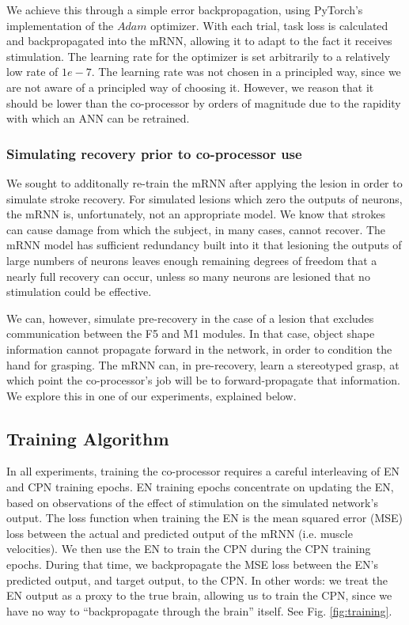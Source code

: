 \documentclass[12pt]{iopart}
\begin{document}
We achieve this through a simple error backpropagation, using PyTorch's
implementation of the $Adam$ optimizer. With each trial, task loss is
calculated and backpropagated into the mRNN, allowing it to adapt to
the fact it receives stimulation. The learning rate for the optimizer
is set arbitrarily to a relatively low rate of $1e-7$. The learning
rate was not chosen in a principled way, since we are not aware of a
principled way of choosing it. However, we reason that it should be
lower than the co-processor by orders of magnitude due
to the rapidity with which an ANN can be retrained.

\subsubsection{Simulating recovery prior to co-processor use}
We sought to additonally re-train the mRNN after applying the lesion in
order to simulate stroke recovery. For simulated lesions which zero the outputs
of neurons, the mRNN is, unfortunately, not an appropriate model.
We know that strokes can cause damage from which the subject, in many cases,
cannot recover. The mRNN model has sufficient redundancy built into it that
lesioning the outputs of large numbers of neurons leaves enough remaining
degrees of freedom that a nearly full recovery can occur, unless so many
neurons are lesioned that no stimulation could be effective.

We can, however, simulate pre-recovery in the case of a lesion that excludes
communication between the F5 and M1 modules. In that case, object shape information
cannot propagate forward in the network, in order to condition the hand for
grasping. The mRNN can, in pre-recovery, learn a stereotyped grasp, at which
point the co-processor's job will be to forward-propagate that information.
We explore this in one of our experiments, explained below.

\subsection{Training Algorithm}
In all experiments, training the co-processor requires a careful interleaving of
EN and CPN training epochs. EN training epochs concentrate on updating the EN,
based on observations of the effect of stimulation on the simulated network's output.
The loss function when training the EN is the mean squared error (MSE) loss between the
actual and predicted output of the mRNN (i.e. muscle velocities). We then use the EN
to train the CPN during the CPN training epochs. During that time, we backpropagate
the MSE loss between the EN's predicted output, and target output, to the CPN. In
other words: we treat the EN output as a proxy to the true brain, allowing us
to train the CPN, since we have no way to ``backpropagate through the brain'' itself.
See Fig. \ref{fig:training}.
\end{document}
